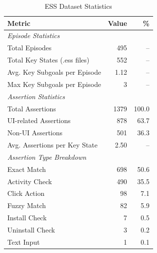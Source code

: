 
\begin{table}[ht]
\centering
\caption{ESS Dataset Statistics}
\label{tab:ess_statistics}
\begin{tabular}{lrr}
\hline
\textbf{Metric} & \textbf{Value} & \textbf{\%} \\
\hline
\multicolumn{3}{l}{\textit{Episode Statistics}} \\
Total Episodes & 495 & -- \\
Total Key States (.ess files) & 552 & -- \\
Avg. Key Subgoals per Episode & 1.12 & -- \\
Max Key Subgoals per Episode & 3 & -- \\
\hline
\multicolumn{3}{l}{\textit{Assertion Statistics}} \\
Total Assertions & 1379 & 100.0 \\
UI-related Assertions & 878 & 63.7 \\
Non-UI Assertions & 501 & 36.3 \\
Avg. Assertions per Key State & 2.50 & -- \\
\hline
\multicolumn{3}{l}{\textit{Assertion Type Breakdown}} \\
Exact Match & 698 & 50.6 \\
Activity Check & 490 & 35.5 \\
Click Action & 98 & 7.1 \\
Fuzzy Match & 82 & 5.9 \\
Install Check & 7 & 0.5 \\
Uninstall Check & 3 & 0.2 \\
Text Input & 1 & 0.1 \\
\hline
\end{tabular}
\end{table}

